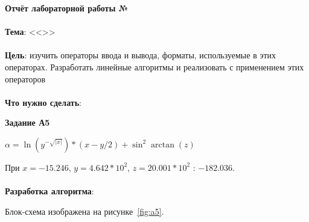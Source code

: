 \documentclass[12pt, a4paper, simple]{eskdtext}
\def \gpiDocTopic {Отчёт лабораторной работы №\gpiDocNum}
\begin{document}



\begin{center}
    \textbf{\gpiDocTopic}
\end{center}

\paragraph{} \textbf{Тема}: <<\gpiTopicRep>>

\paragraph{} \textbf{Цель}:
изучить операторы ввода и вывода, форматы, используемые в этих операторах.
Разработать линейные алгоритмы и реализовать с применением этих операторов

\paragraph{} \textbf{Что нужно сделать}:

\begin{center}
    \textbf{Задание А5}
\end{center}

$\alpha = \ln{(y^{-\sqrt{|x|}})} * (x - y/2) + \sin^2{\arctan{(z)}}$

При $x = -15.246$, $y = 4.642*10^2$, $z = 20.001*10^2$ : $-182.036$.

\paragraph{} \textbf{Разработка алгоритма}:

Блок-схема изображена на рисунке~\ref{fig:a5}.
\end{document}
